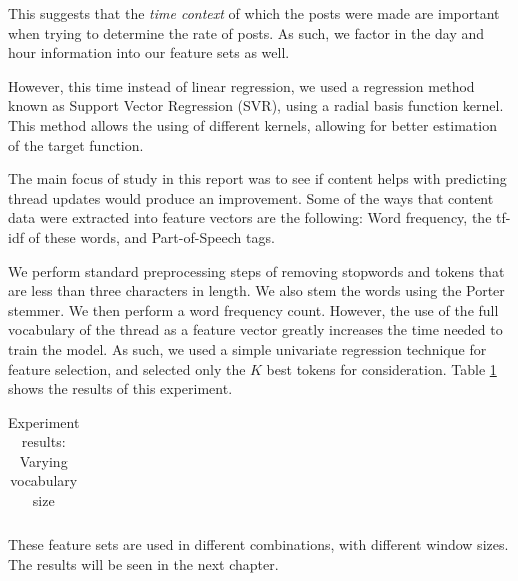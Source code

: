 This suggests that the \emph{time context} of which the posts were made are 
important when trying to determine the rate of posts.  As such, we factor in the 
day and hour information into our feature sets as well.

However, this time instead of linear regression, we used a regression method 
known as Support Vector Regression (SVR), using a radial basis function kernel.  
This method allows the using of different kernels, allowing for better 
estimation of the target function.

The main focus of study in this report was to see if content helps with 
predicting thread updates would produce an improvement. Some of the ways that 
content data were extracted into feature vectors are the following: Word 
frequency, the tf-idf of these words, and Part-of-Speech tags.

We perform standard preprocessing steps of removing stopwords and tokens that are less than three characters in length. We also stem the words using the Porter stemmer.
We then perform a word frequency count. However, the use 
of the full vocabulary of the thread as a feature vector greatly increases the 
time needed to train the model.
 As such, we used a simple univariate regression 
technique for feature selection, and selected only the $K$ best tokens for 
consideration. Table \ref{table:vocab_exp} shows the results of this experiment.  
	
\begin{table}
	\footnotesize
\begin{center}
	\begin{tabular}{|l|c|c|c|c|c|c|c|c|}
	\hline
	
	\hline
	\end{tabular}
\end{center}
	\caption{Experiment results: Varying vocabulary size}
	\label{table:vocab_exp}
\end{table}

These feature sets are used in different combinations, with different window 
sizes. The results will be seen in the next chapter.

